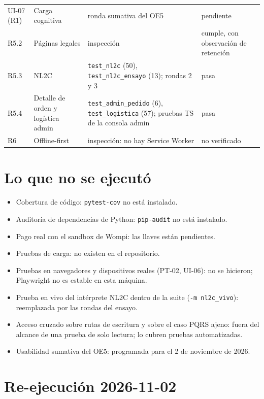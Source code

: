 \documentclass[11pt,letterpaper]{article}
\newcommand{\ruta}[1]{\texttt{\small #1}}
\begin{document}
\begin{longtable}{L{2.2cm}L{3.6cm}L{6.3cm}L{2.6cm}}
UI-07 (R1) & Carga cognitiva & ronda sumativa del OE5 & pendiente \\
R5.2 & Páginas legales & inspección & cumple, con observación de retención \\
R5.3 & NL2C & \ruta{test\_\allowbreak{}nl2c} (50), \ruta{test\_\allowbreak{}nl2c\_\allowbreak{}ensayo} (13); rondas 2 y 3 & pasa \\
R5.4 & Detalle de orden y logística admin & \ruta{test\_\allowbreak{}admin\_\allowbreak{}pedido} (6), \ruta{test\_\allowbreak{}logistica} (57);
pruebas TS de la consola admin & pasa \\
R6 & Offline-first & inspección: no hay Service Worker & no verificado \\
\bottomrule
\end{longtable}

\section{Lo que no se ejecutó}

\begin{itemize}
  \item Cobertura de código: \ruta{pytest-cov} no está instalado.
  \item Auditoría de dependencias de Python: \ruta{pip-audit} no está instalado.
  \item Pago real con el sandbox de Wompi: las llaves están pendientes.
  \item Pruebas de carga: no existen en el repositorio.
  \item Pruebas en navegadores y dispositivos reales (PT-02, UI-06): no se hicieron; Playwright no es estable en
        esta máquina.
  \item Prueba en vivo del intérprete NL2C dentro de la suite (\ruta{-m nl2c\_\allowbreak{}vivo}): reemplazada por las rondas
        del ensayo.
  \item Acceso cruzado sobre rutas de escritura y sobre el caso PQRS ajeno: fuera del alcance de una prueba de
        solo lectura; lo cubren pruebas automatizadas.
  \item Usabilidad sumativa del OE5: programada para el 2 de noviembre de 2026.
\end{itemize}

\section{Re-ejecución 2026-11-02}\label{sec:reejecucion}
\end{document}
